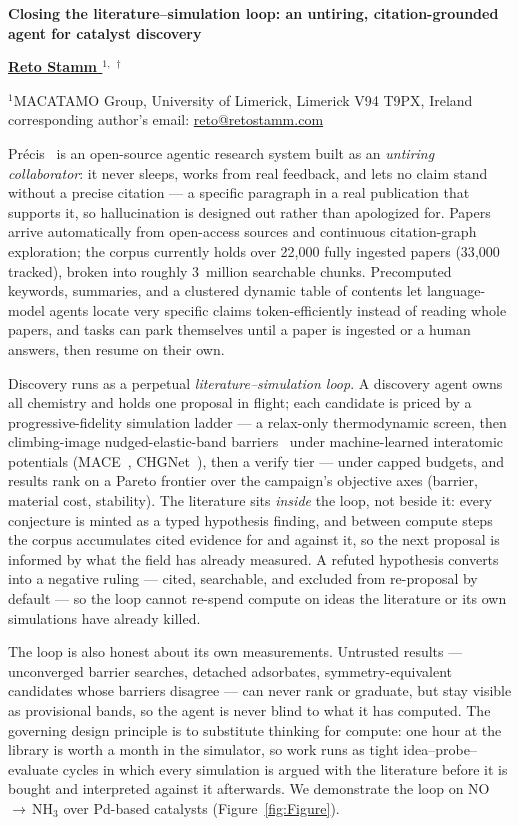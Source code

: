\documentclass[11pt]{article}
\newcommand{\abstracttitle}[1]{
\setstretch{1.15}    %
 \begin{center}{\Large {\bf #1}}\end{center}
\setstretch{1.0}
}
\newcommand{\authors}[1]{
 \begin{center}{\bf #1} \end{center}
 \setstretch{1.0}
}
\newcommand{\addresses}[1]{
\setstretch{0.95}
 \begin{center}{\small #1} \end{center}
\setstretch{1}
}
\begin{document}
\abstracttitle{Closing the literature--simulation loop: an untiring, citation-grounded agent for catalyst discovery}
\authors{
\underline{Reto Stamm $^{1,~\dag}$}
}

\addresses{%
$^{1}$MACATAMO Group, University of Limerick, Limerick V94 T9PX, Ireland \\
\dag corresponding author's email: \href{mailto:reto@retostamm.com}{reto@retostamm.com}
}

Pr\'ecis~\cite{Stamm2026precis} is an open-source agentic research system
built as an \emph{untiring collaborator}: it never sleeps, works from real
feedback, and lets no claim stand without a precise citation --- a specific
paragraph in a real publication that supports it, so hallucination is
designed out rather than apologized for. Papers arrive automatically from
open-access sources and continuous citation-graph exploration; the corpus
currently holds over 22{,}000 fully ingested papers (33{,}000 tracked),
broken into roughly 3~million searchable chunks. Precomputed keywords,
summaries, and a clustered dynamic table of contents let language-model
agents locate very specific claims token-efficiently instead of reading
whole papers, and tasks can park themselves until a paper is ingested or a
human answers, then resume on their own.

Discovery runs as a perpetual \emph{literature--simulation loop}. A
discovery agent owns all chemistry and holds one proposal in flight; each
candidate is priced by a progressive-fidelity simulation ladder --- a
relax-only thermodynamic screen, then climbing-image nudged-elastic-band
barriers~\cite{Henkelman2000} under machine-learned interatomic potentials
(MACE~\cite{Batatia2022}, CHGNet~\cite{Deng2023}), then a verify tier ---
under capped budgets, and results rank on a Pareto frontier over the
campaign's objective axes (barrier, material cost, stability). The
literature sits \emph{inside} the loop, not beside it: every conjecture is
minted as a typed hypothesis finding, and between compute steps the corpus
accumulates cited evidence for and against it, so the next proposal is
informed by what the field has already measured. A refuted hypothesis
converts into a negative ruling --- cited, searchable, and excluded from
re-proposal by default --- so the loop cannot re-spend compute on ideas the
literature or its own simulations have already killed.

The loop is also honest about its own measurements. Untrusted results ---
unconverged barrier searches, detached adsorbates, symmetry-equivalent
candidates whose barriers disagree --- can never rank or graduate, but stay
visible as provisional bands, so the agent is never blind to what it has
computed. The governing design principle is to substitute thinking for
compute: one hour at the library is worth a month in the simulator, so work
runs as tight idea--probe--evaluate cycles in which every simulation is
argued with the literature before it is bought and interpreted against it
afterwards. We demonstrate the loop on NO\,$\to$\,NH$_3$ over Pd-based
catalysts (Figure~\ref{fig:Figure}).
\end{document}

